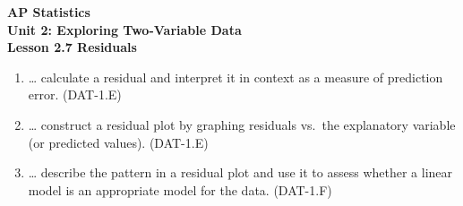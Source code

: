 \documentclass[10pt]{article}
\begin{document}
\vspace{-0.8in}

\begin{center}
  {\color{white}\textbf{\LARGE AP Statistics}}\\[4pt]
  {\color{skymid}\large\textbf{Unit 2: Exploring Two-Variable Data}}\\[6pt]
  {\color{white}\textbf{\large Lesson 2.7 \quad Residuals}}
\end{center}

\vspace{0.22in}
\namedateperiod
\vspace{0.18in}

\begin{learningtargetbox}
\small
\begin{enumerate}[leftmargin=1.5em, itemsep=5pt]
  \item \ldots{} calculate a residual and interpret it in context as a measure of prediction
        error. \hfill\textcolor{slate}{\small(DAT-1.E)}
  \item \ldots{} construct a residual plot by graphing residuals vs.\ the explanatory variable
        (or predicted values). \hfill\textcolor{slate}{\small(DAT-1.E)}
  \item \ldots{} describe the pattern in a residual plot and use it to assess whether a linear
        model is an appropriate model for the data. \hfill\textcolor{slate}{\small(DAT-1.F)}
\end{enumerate}
\end{learningtargetbox}

\vspace{0.14in}
\end{document}
